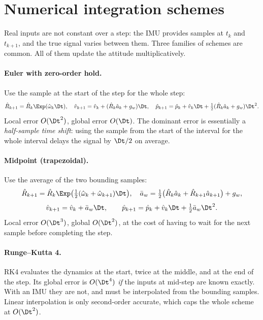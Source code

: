 \section{Numerical integration schemes}

Real inputs are not constant over a step: the IMU provides samples at $t_k$ and $t_{k+1}$, and the true signal
varies between them. Three families of schemes are common. All of them update the attitude
multiplicatively.

\paragraph{Euler with zero-order hold.} Use the sample at the start of the step for the whole step:
\begin{equation}
  \hat R_{k+1} = \hat R_k\Exp(\hat\omega_k\Dt), \quad
  \hat v_{k+1} = \hat v_k + (\hat R_k\hat a_k + g_w)\Dt, \quad
  \hat p_{k+1} = \hat p_k + \hat v_k\Dt + \tfrac12(\hat R_k\hat a_k + g_w)\Dt^2 .
\end{equation}
Local error $O(\Dt^2)$, global error $O(\Dt)$. The dominant error is essentially a \emph{half-sample time
shift}: using the sample from the start of the interval for the whole interval delays the signal by
$\Dt/2$ on average.

\paragraph{Midpoint (trapezoidal).} Use the average of the two bounding samples:
\begin{equation}
  \hat R_{k+1} = \hat R_k\Exp\big(\tfrac12(\hat\omega_k + \hat\omega_{k+1})\Dt\big),\quad
  \bar a_w = \tfrac12\big(\hat R_k\hat a_k + \hat R_{k+1}\hat a_{k+1}\big) + g_w,
\end{equation}
\begin{equation*}
  \hat v_{k+1} = \hat v_k + \bar a_w\Dt, \qquad \hat p_{k+1} = \hat p_k + \hat v_k\Dt + \tfrac12\bar a_w\Dt^2 .
\end{equation*}
Local error $O(\Dt^3)$, global $O(\Dt^2)$, at the cost of having to wait for the next sample before
completing the step.

\paragraph{Runge--Kutta 4.} RK4 evaluates the dynamics at the start, twice at the middle, and at the end of
the step. Its global error is $O(\Dt^4)$ \emph{if} the inputs at mid-step are known exactly. With an IMU
they are not, and must be interpolated from the bounding samples. Linear interpolation is only
second-order accurate, which caps the whole scheme at $O(\Dt^2)$.

